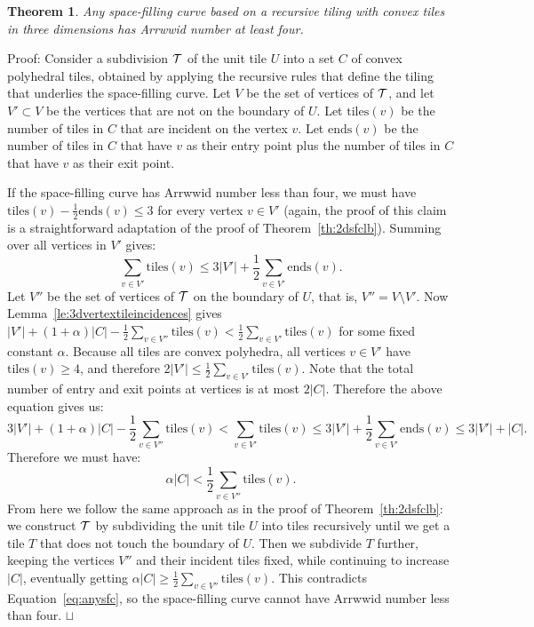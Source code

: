 \documentclass[11pt,a4paper]{article}
\newcommand{\unittile}{\ensuremath{U}\xspace}
\newcommand{\tdegr}{\mathrm{tiles}}
\newcommand{\doors}{\mathrm{ends}}
\newtheorem{theorem}{Theorem}
\newenvironment{proof}{Proof:}{\qed}
\def\squareforqed{\hbox{\rlap{$\sqcap$}$\sqcup$}}
\def\qed{\ifmmode\squareforqed\else{\unskip\nobreak\hfil
\penalty50\hskip1em\null\nobreak\hfil\squareforqed
\parfillskip=0pt\finalhyphendemerits=0\endgraf}\fi}
\begin{document}
\begin{theorem}\label{th:3dsfclb}
Any space-filling curve based on a recursive tiling with convex tiles in three dimensions has Arrwwid number at least four.
\end{theorem}
\begin{proof}
Consider a subdivision ${\cal T}$ of the unit tile $\unittile$ into a set $C$ of convex polyhedral tiles, obtained by applying the recursive rules that define the tiling that underlies the space-filling curve. Let $V$ be the set of vertices of ${\cal T}$, and let $V' \subset V$ be the vertices that are not on the boundary of $\unittile$. Let $\tdegr(v)$ be the number of tiles in $C$ that are incident on the vertex $v$. Let $\doors(v)$ be the number of tiles in $C$ that have $v$ as their entry point plus the number of tiles in $C$ that have $v$ as their exit point.

If the space-filling curve has Arrwwid number less than four, we must have $\tdegr(v) - \frac12 \doors(v) \leq 3$ for every vertex $v \in V'$ (again, the proof of this claim is a straightforward adaptation of the proof of Theorem~\ref{th:2dsfclb}). Summing over all vertices in $V'$ gives:\[
\sum_{v \in V'} \tdegr(v) \leq 3|V'| + \frac12 \sum_{v \in V'} \doors(v).
\]
Let $V''$ be the set of vertices of ${\cal T}$ on the boundary of \unittile, that is, $V'' = V \setminus V'$. Now Lemma~\ref{le:3dvertextileincidences} gives $|V'| + (1+\alpha)|C| - \frac12 \sum_{v \in V''} \tdegr(v) < \frac12 \sum_{v \in V'} \tdegr(v)$ for some fixed constant $\alpha$. Because all tiles are convex polyhedra, all vertices $v \in V'$ have $\tdegr(v) \geq 4$, and therefore $2|V'| \leq \frac12 \sum_{v \in V'} \tdegr(v)$. Note that the total number of entry and exit points at vertices is at most $2|C|$. Therefore the above equation gives us:\[
3|V'| + (1+\alpha)|C| - \frac12 \sum_{v \in V''} \tdegr(v) < \sum_{v \in V'} \tdegr(v) \leq 3|V'| + \frac12 \sum_{v \in V'} \doors(v) \leq 3|V'| + |C|.
\]
Therefore we must have:\begin{equation}\label{eq:anysfc}
\alpha|C| < \frac12 \sum_{v \in V''} \tdegr(v).
\end{equation}
From here we follow the same approach as in the proof of Theorem~\ref{th:2dsfclb}: we construct ${\cal T}$ by subdividing the unit tile \unittile into tiles recursively until we get a tile $T$ that does not touch the boundary of \unittile. Then we subdivide $T$ further, keeping the vertices $V''$ and their incident tiles fixed, while continuing to increase $|C|$, eventually getting $\alpha|C| \geq \frac12 \sum_{v \in V''} \tdegr(v)$. This contradicts Equation~\ref{eq:anysfc}, so the space-filling curve cannot have Arrwwid number less than four.
\end{proof}
\end{document}
